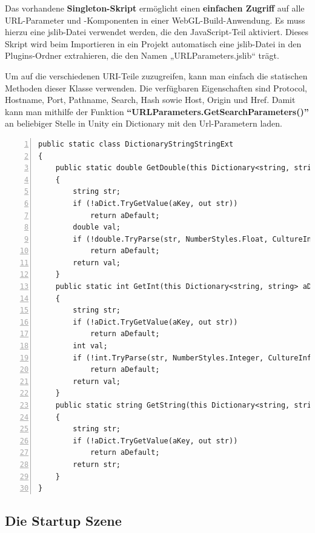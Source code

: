 Das vorhandene \textbf{Singleton-Skript} ermöglicht einen \textbf{einfachen Zugriff} auf alle URL-Parameter und -Komponenten in einer WebGL-Build-Anwendung. Es muss hierzu eine jslib-Datei verwendet werden, die den JavaScript-Teil aktiviert. Dieses Skript wird beim Importieren in ein Projekt automatisch eine jslib-Datei in den Plugins-Ordner extrahieren, die den Namen „URLParameters.jslib“ trägt.

Um auf die verschiedenen URI-Teile zuzugreifen, kann man einfach die statischen Methoden dieser Klasse verwenden. Die verfügbaren Eigenschaften sind Protocol, Hostname, Port, Pathname, Search, Hash sowie Host, Origin und Href. Damit kann man mithilfe der Funktion \textbf{``URLParameters.GetSearchParameters()''} an beliebiger Stelle in Unity ein Dictionary mit den Url-Parametern laden.

\begin{lstlisting}[numbers=left,caption={UrlParameter},label={lst:unity-url-parameter}]
public static class DictionaryStringStringExt
{
    public static double GetDouble(this Dictionary<string, string> aDict, string aKey, double aDefault)
    {
        string str;
        if (!aDict.TryGetValue(aKey, out str))
            return aDefault;
        double val;
        if (!double.TryParse(str, NumberStyles.Float, CultureInfo.InvariantCulture, out val))
            return aDefault;
        return val;
    }
    public static int GetInt(this Dictionary<string, string> aDict, string aKey, int aDefault)
    {
        string str;
        if (!aDict.TryGetValue(aKey, out str))
            return aDefault;
        int val;
        if (!int.TryParse(str, NumberStyles.Integer, CultureInfo.InvariantCulture, out val))
            return aDefault;
        return val;
    }
    public static string GetString(this Dictionary<string, string> aDict, string aKey, string aDefault)
    {
        string str;
        if (!aDict.TryGetValue(aKey, out str))
            return aDefault;
        return str;
    }
}
\end{lstlisting}


\subsection{Die Startup Szene}
\label{subsec:unity-startup-scene}


